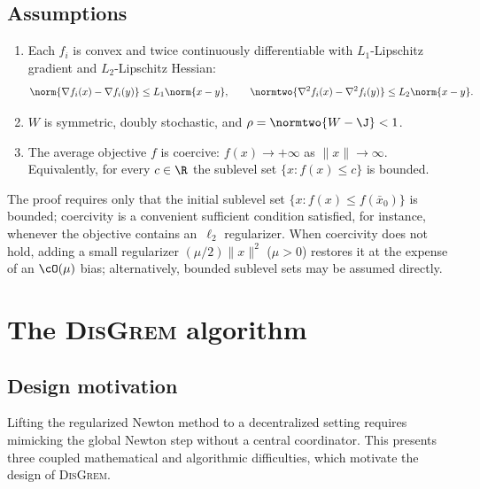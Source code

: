 \documentclass[review,onefignum,onetabnum]{siamart171218}
\begin{document}
	\subsection{Assumptions}
	\begin{assumption}\label{ass:standing}
		\begin{enumerate}[nosep,leftmargin=1em]
		\item Each $f_i$ is convex and twice continuously differentiable
		with $L_1$-Lipschitz gradient and $L_2$-Lipschitz Hessian:
			\[
			\norm{\nabla f_i(x)-\nabla f_i(y)}\le L_1\norm{x-y},
			\qquad
			\normtwo{\nabla^2 f_i(x)-\nabla^2 f_i(y)}\le L_2\norm{x-y}.
			\]
			\item $W$ is symmetric, doubly stochastic, and $\rho=\normtwo{W-\J}<1$.
		\item The average objective $f$ is coercive: $f(x)\to+\infty$ as $\|x\|\to\infty$.
			Equivalently, for every $c\in\R$ the sublevel set $\{x:f(x)\le c\}$ is bounded.
		\end{enumerate}
	\end{assumption}

	\begin{remark}
	The proof requires only that the initial sublevel set
	$\{x : f(x) \le f(\bar x_0)\}$ is bounded;
	coercivity is a convenient sufficient condition satisfied,
	for instance, whenever the objective contains an~$\ell_2$
	regularizer.
	When coercivity does not hold, adding a small regularizer
	$(\mu/2)\|x\|^2$ ($\mu>0$) restores it at the expense of an
	$\cO(\mu)$ bias; alternatively, bounded sublevel sets may be
	assumed directly.
	\end{remark}

	
\section{The \textsc{DisGrem} algorithm}\label{sec:alg}
	
	\subsection{Design motivation}\label{ssec:design}

	Lifting the regularized Newton method to a decentralized setting
	requires mimicking the global Newton step without a central
	coordinator.
	This presents three coupled mathematical and algorithmic
	difficulties, which motivate the design of \textsc{DisGrem}.
\end{document}
